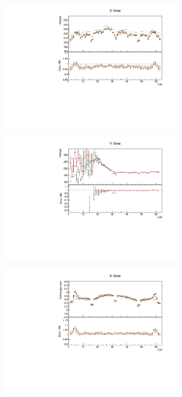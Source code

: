 \documentclass[12pt,a4paper]{article}
\begin{document}
\begin{figure}[h!]
\begin{subfigure}{0.5\textwidth}
  \end{subfigure}
  \begin{subfigure}{0.5\textwidth}
    \includegraphics[width=\linewidth]{essentialsec_tb/pecorr_cell_x.pdf}
  \end{subfigure}
  \begin{subfigure}{0.5\textwidth}
    \includegraphics[width=\linewidth]{essentialsec_tb/pecorr_cell_y.pdf}
  \end{subfigure}
  \begin{subfigure}{0.5\textwidth}
    \includegraphics[width=\linewidth]{essentialsec_tb/cm_cell_x.pdf}

\end{subfigure}
\end{figure}
\end{document}
